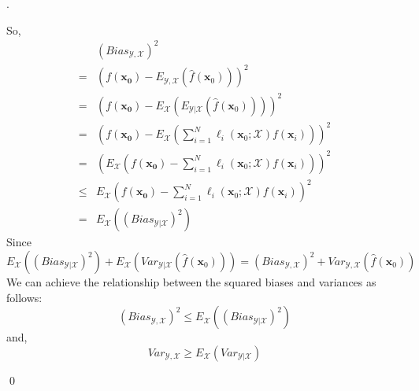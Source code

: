 \documentclass[12pt]{article}
\newenvironment{sol}
  {\par\vspace{3mm}\noindent{\it Solution}.}
  {\qed}
\begin{document}
\begin{sol}
\begin{flushleft}
So,
\begin{equation}
\nonumber
\begin{split}
&(Bias_{\mathcal{Y},\mathcal{X}})^2\\
=&(f(\bm{x_0})-E_{\mathcal{Y},\mathcal{X}}(\hat{f}(\bm{x}_0)))^2\\
=&(f(\bm{x_0})-E_{\mathcal{X}}(E_{\mathcal{Y}\vert\mathcal{X}}(\hat{f}(\bm{x}_0))))^2\\
=&\left(f(\bm{x_0})-E_{\mathcal{X}}\left(\sum_{i=1}^{N}\ell _i(\bm{x}_0;\mathcal{X})f(\bm{x}_i)\right)\right)^2\\
=&\left(E_{\mathcal{X}}\left(f(\bm{x_0})-\sum_{i=1}^{N}\ell _i(\bm{x}_0;\mathcal{X})f(\bm{x}_i)\right)\right)^2\\
\le&E_{\mathcal{X}}\left(f(\bm{x_0})-\sum_{i=1}^{N}\ell _i(\bm{x}_0;\mathcal{X})f(\bm{x}_i)\right)^2\\
=&E_{\mathcal{X}}((Bias_{\mathcal{Y}\vert\mathcal{X}})^2)
\end{split}
\end{equation}
Since $$
E_{\mathcal{X}}((Bias_{\mathcal{Y}\vert\mathcal{X}})^2)+E_{\mathcal{X}}(Var_{\mathcal{Y}\vert\mathcal{X}}(\hat{f}(\bm{x}_0)))=
(Bias_{\mathcal{Y},\mathcal{X}})^2+Var_{\mathcal{Y},\mathcal{X}}(\hat{f}(\bm{x}_0))
$$
We can achieve the relationship between the squared biases and variances as follows:
$$(Bias_{\mathcal{Y},\mathcal{X}})^2 \le E_{\mathcal{X}}((Bias_{\mathcal{Y}\vert\mathcal{X}})^2)$$
and,
$$Var_{\mathcal{Y},\mathcal{X}} \geq E_{\mathcal{X}}(Var_{\mathcal{Y}\vert\mathcal{X}})$$
\end{flushleft}
\end{sol}
\end{document}
